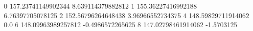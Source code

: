 0 157.23741149902344 8.639114379882812
1 155.36227416992188 6.76397705078125
2 152.56796264648438 3.96966552734375
4 148.59829711914062 0.0
6 148.09963989257812 -0.4986572265625
8 147.02798461914062 -1.5703125
